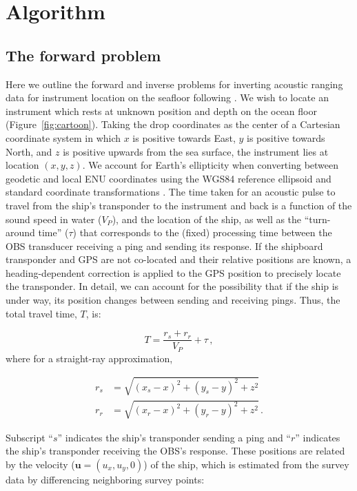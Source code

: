 \documentclass[10pt,titlepage]{article}
\begin{document}
\section{Algorithm }


\subsection{The forward problem}

Here we outline the forward and inverse problems for inverting acoustic ranging data for instrument location on the seafloor following \citet{Creager1982}. We wish to locate an instrument which rests at unknown position and depth on the ocean floor (Figure~\ref{fig:cartoon}). Taking the drop coordinates as the center of a Cartesian coordinate system in which $x$ is positive towards East, $y$ is positive towards North, and $z$ is positive upwards from the sea surface, the instrument lies at location $(x,y,z)$. We account for Earth's ellipticity when converting between geodetic and local ENU coordinates using the WGS84 reference ellipsoid \citep{WGS84_2000} and standard coordinate transformations \citep[i.e.,][]{Hoffmann_Wellenhof_2001}. The time taken for an acoustic pulse to travel from the ship's transponder to the instrument and back is a function of the sound speed in water ($V_P$), and the location of the ship, as well as the ``turn-around time'' ($\tau$) that corresponds to the (fixed) processing time between the OBS transducer receiving a ping and sending its response. If the shipboard transponder and GPS are not co-located and their relative positions are known, a heading-dependent correction is applied to the GPS position to precisely locate the transponder. In detail, we can account for the possibility that if the ship is under way, its position changes between sending and receiving pings. Thus, the total travel time, $T$, is: 

\begin{equation}
T = \frac{r_s + r_r}{V_P} + \tau \,, \label{eq:forward_send_receive}
\end{equation}
where for a straight-ray approximation,

\begin{align}
	r_s &= \sqrt{(x_s - x)^2 + (y_s - y)^2 + z^2}\\
	r_r &= \sqrt{(x_r - x)^2 + (y_r - y)^2 + z^2} \,.
\end{align}

Subscript ``$s$'' indicates the ship's transponder sending a ping and ``$r$'' indicates the ship's transponder receiving the OBS's response. These positions are related by the velocity ($\mathbf{u} = (u_x,u_y,0)$) of the ship, which is estimated from the survey data by differencing neighboring survey points:
\end{document}
